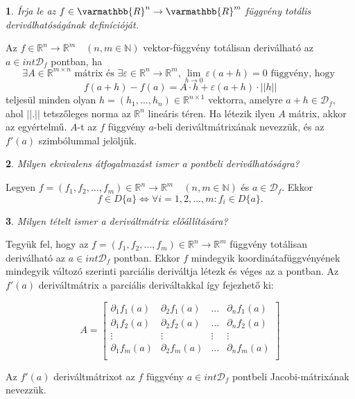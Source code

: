\documentclass[a4paper]{article}
\def\R{\mathbb{R}}
\def\N{\mathbb{N}}
\def\RR{\varmathbb{R}}
\theoremstyle{qstyle}
\newtheorem{question}{}{}
\begin{document}
	\begin{question}
		Írja le az $f \in \RR^n \to \RR^m$ függvény totális deriválhatóságának definícióját.   
	\end{question}
	Az $f \in \R^{n} \to \R^{m} \quad (n,m \in \N)$ vektor-függvény totálisan deriválható az $a \in int\mathcal{D}_{f}$ pontban, ha
	$$\exists A \in \R^{m \times n} \text{ mátrix és } \exists \varepsilon \in \R^{n} \to \R^{m}, \lim\limits_{h \to 0} \varepsilon(a+h) = 0 \text{ függvény, hogy }$$
	$$f(a+h)-f(a) = A \cdot h + \varepsilon(a+h) \cdot ||h||$$
	teljesül minden olyan $h = (h_1,\dots,h_n) \in \R^{n \times 1}$ vektorra, amelyre $a+h \in \mathcal{D}_{f}$, ahol $||.||$ tetszőleges norma az $\R^{n}$ lineáris téren. Ha létezik ilyen $A$ mátrix, akkor az egyértelmű. $A$-t az $f$ függvény $a$-beli deriváltmátrixának nevezzük, és az $f'(a)$ szimbólummal jelöljük.
	
	\begin{question}
		Milyen ekvivalens átfogalmazást ismer a pontbeli deriválhatóságra?   
	\end{question}
	Legyen $f = (f_1, f_2, \dots, f_m) \in \R^n \to \R^m \quad (n,m \in \N)$ és $a \in \mathcal{D}_f$. Ekkor 
	$$f \in D\{a\} \Longleftrightarrow \forall i = 1,2,\dots,m : f_i \in D\{a\} \text{.}$$
	
	\begin{question}
		Milyen tételt ismer a deriváltmátrix előállítására?   
	\end{question}
	Tegyük fel, hogy az $f = (f_{1}, f_{2},\dots,f_{m}) \in \R^{n} \to \R^{m}$ függvény totálisan deriválható az $a \in int \mathcal{D}_{f}$ pontban. Ekkor $f$ mindegyik koordinátafüggvényének mindegyik változó szerinti parciális deriváltja létezk és véges az a pontban. Az $f'(a)$ deriváltmátrix a parciális deriváltakkal így fejezhető ki:
	
	$$A = \begin{bmatrix} 
	\partial_{1}f_{1}(a) & \partial_{2}f_{1}(a) & \dots & \partial_{n}f_{1}(a) \\
	\partial_{1}f_{2}(a) & \partial_{2}f_{2}(a) & \dots & \partial_{n}f_{2}(a) \\
	\vdots & \vdots &  \vdots &  \vdots  \\
	\partial_{1}f_{m}(a) & \partial_{2}f_{m}(a) & \dots & \partial_{n}f_{m}(a) \\
	\end{bmatrix}$$
	
	Az $f'(a)$ deriváltmátrixot az $f$ függvény $a \in int \mathcal{D}_{f}$ pontbeli Jacobi-mátrixának nevezzük.
	
\end{document}
